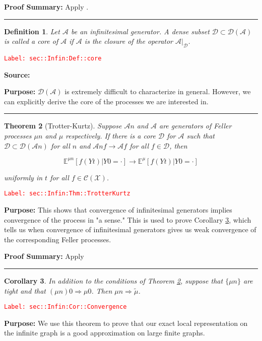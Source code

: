 \documentclass[12pt]{article}
\newcommand{\mb}{\mathbb}
\newcommand{\mc}{\mathcal}
\newcommand{\ra}{\rightarrow}
\newcommand{\tr}{\textcolor{red}}
\newcommand{\labe}[1]{\tr{\texttt{Label: #1}}}
\newcommand{\purpose}{\textbf{Purpose: }}
\newcommand{\pfsum}{\textbf{Proof Summary: }}
\newcommand{\lin}{\rule{\linewidth}{0.4 pt}}
\newcommand{\exmu}[2]{\mb{E}^{#1}\left[#2\right]}	%
\renewcommand{\t}{t}							%
\newcommand{\IG}{\mc{A}}						%
\newcommand{\core}{\mc{D}}						%
\newcommand{\cont}{\mc{C}}						%
\newcommand{\alt}[1]{\widetilde{#1}}			%
\newcommand{\m}{\mu}							%
\newcommand{\XX}{Y}								%
\newcommand{\spce}{\mc{X}}						%
\newtheorem{thms}{Theorem}[section]
\newtheorem{coro}[thms]{Corollary}
\newtheorem{defn}[thms]{Definition}
\begin{document}
\pfsum Apply \cite[Theorem 1.5,2.9]{Lig85}.

\lin

\begin{defn}
Let \(\IG{}\) be an infinitesimal generator. A dense subset \(\core\subset \core(\IG{})\) is called a core of \(\IG{}\) if \(\IG{}\) is the closure of the operator \(\IG{}|_\core\).
\label{sec::Infin:Def::core}
\end{defn}
\labe{sec::Infin:Def::core}

\textbf{Source: }\cite[Definition 2.11]{Lig85}

\purpose \(\core(\IG{})\) is extremely difficult to characterize in general. However, we can explicitly derive the core of the processes we are interested in.

\lin

\begin{thms}[Trotter-Kurtz]
Suppose \(\IG{n}\) and \(\IG{}\) are generators of Feller processes \(\m{n}\) and \(\m\) respectively. If there is a core \(\core\) for \(\IG{}\) such that \(\core \subset \mc{D}(\IG{n})\) for all \(n\) and \(\IG{n} f \ra \IG{} f\) for all \(f \in \core\), then 

\[\exmu{\m{n}}{f(\XX{}{\t})|\XX{}{0}=\cdot} \ra \exmu{\mu}{f(\XX{}{\t})|\XX{}{0}=\cdot}\]

uniformly in \(\t\) for all \(f \in \cont(\spce)\).
\label{sec::Infin:Thm::TrotterKurtz}
\end{thms}
\labe{sec::Infin:Thm::TrotterKurtz}

\purpose This shows that convergence of infinitesimal generators implies convergence of the process in "a sense." This is used to prove Corollary \ref{sec::Infin:Cor::Convergence}, which tells us when convergence of infinitesimal generators gives us weak convergence of the corresponding Feller processes.

\pfsum Apply \cite[Theorem 2.12]{Lig85}

\lin

\begin{coro}
In addition to the conditions of Theorem \ref{sec::Infin:Thm::TrotterKurtz}, suppose that \(\{\m{n}\}\) are tight and that \((\m{n}){0} \Rightarrow \m{0}\). Then \(\m{n} \Rightarrow \alt{\m}\).
\label{sec::Infin:Cor::Convergence}
\end{coro}
\labe{sec::Infin:Cor::Convergence}

\purpose We use this theorem to prove that our exact local representation on the infinite graph is a good approximation on large finite graphs.
\end{document}
